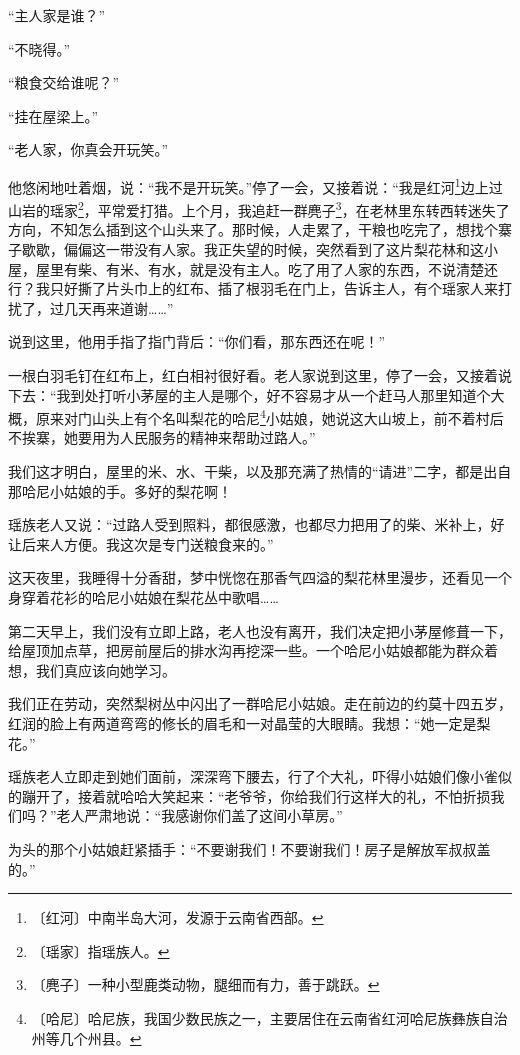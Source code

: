 \documentclass[12pt,UTF-8,openany]{ctexbook}
\begin{document}
\begin{large}
    “主人家是谁？”
    
    “不晓得。”
    
    “粮食交给谁呢？”
    
    “挂在屋梁上。”
    
    “老人家，你真会开玩笑。”
    
    他悠闲地吐着烟，说：“我不是开玩笑。”停了一会，又接着说：“我是红河\footnote{〔红河〕中南半岛大河，发源于云南省西部。}边上过山岩的瑶家\footnote{〔瑶家〕指瑶族人。}，平常爱打猎。上个月，我追赶一群麂子\footnote{〔麂子〕一种小型鹿类动物，腿细而有力，善于跳跃。}，在老林里东转西转迷失了方向，不知怎么插到这个山头来了。那时候，人走累了，干粮也吃完了，想找个寨子歇歇，偏偏这一带没有人家。我正失望的时候，突然看到了这片梨花林和这小屋，屋里有柴、有米、有水，就是没有主人。吃了用了人家的东西，不说清楚还行？我只好撕了片头巾上的红布、插了根羽毛在门上，告诉主人，有个瑶家人来打扰了，过几天再来道谢……”
    
    说到这里，他用手指了指门背后：“你们看，那东西还在呢！”
    
    一根白羽毛钉在红布上，红白相衬很好看。老人家说到这里，停了一会，又接着说下去：“我到处打听小茅屋的主人是哪个，好不容易才从一个赶马人那里知道个大概，原来对门山头上有个名叫梨花的哈尼\footnote{〔哈尼〕哈尼族，我国少数民族之一，主要居住在云南省红河哈尼族彝族自治州等几个州县。}小姑娘，她说这大山坡上，前不着村后不挨寨，她要用为人民服务的精神来帮助过路人。”
    
    我们这才明白，屋里的米、水、干柴，以及那充满了热情的“请进”二字，都是出自那哈尼小姑娘的手。多好的梨花啊！
    
    瑶族老人又说：“过路人受到照料，都很感激，也都尽力把用了的柴、米补上，好让后来人方便。我这次是专门送粮食来的。”
    
    这天夜里，我睡得十分香甜，梦中恍惚在那香气四溢的梨花林里漫步，还看见一个身穿着花衫的哈尼小姑娘在梨花丛中歌唱……
    
    第二天早上，我们没有立即上路，老人也没有离开，我们决定把小茅屋修葺一下，给屋顶加点草，把房前屋后的排水沟再挖深一些。一个哈尼小姑娘都能为群众着想，我们真应该向她学习。
    
    我们正在劳动，突然梨树丛中闪出了一群哈尼小姑娘。走在前边的约莫十四五岁，红润的脸上有两道弯弯的修长的眉毛和一对晶莹的大眼睛。我想：“她一定是梨花。”
    
    瑶族老人立即走到她们面前，深深弯下腰去，行了个大礼，吓得小姑娘们像小雀似的蹦开了，接着就哈哈大笑起来：“老爷爷，你给我们行这样大的礼，不怕折损我们吗？”老人严肃地说：“我感谢你们盖了这间小草房。”
    
    为头的那个小姑娘赶紧插手：“不要谢我们！不要谢我们！房子是解放军叔叔盖的。”
    

\end{large}
\end{document}

